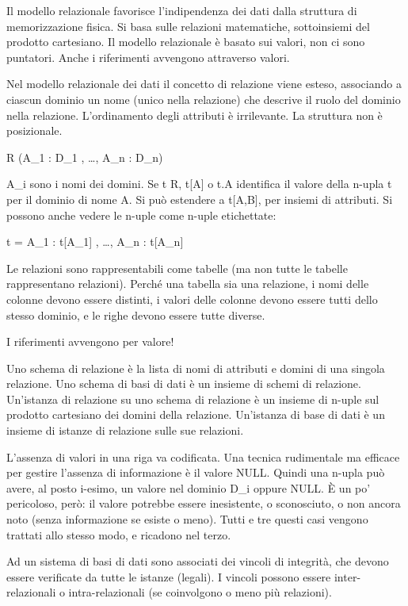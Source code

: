 Il modello relazionale favorisce l'indipendenza dei dati dalla struttura di memorizzazione fisica. Si basa sulle relazioni matematiche, sottoinsiemi del prodotto cartesiano. Il modello relazionale \`e basato sui valori, non ci sono puntatori. Anche i riferimenti avvengono attraverso valori.

Nel modello relazionale dei dati il concetto di relazione viene esteso, associando a ciascun dominio un nome (unico nella relazione) che descrive il ruolo del dominio nella relazione. L'ordinamento degli attributi \`e irrilevante. La struttura non \`e posizionale.

R (A_1 : D_1 , \ldots , A_n : D_n)

A_i sono i nomi dei domini. Se t \in R, t[A] o t.A identifica il valore della n-upla t per il dominio di nome A. Si pu\`o estendere a t[A,B], per insiemi di attributi. Si possono anche vedere le n-uple come n-uple etichettate:

t = \langle A_1 : t[A_1] , \ldots , A_n : t[A_n] \rangle

Le relazioni sono rappresentabili come tabelle (ma non tutte le tabelle rappresentano relazioni). Perch\'e una tabella sia una relazione, i nomi delle colonne devono essere distinti, i valori delle colonne devono essere tutti dello stesso dominio, e le righe devono essere tutte diverse.

I riferimenti avvengono per valore!

Uno schema di relazione \`e la lista di nomi di attributi e domini di una singola relazione. Uno schema di basi di dati \`e un insieme di schemi di relazione. Un'istanza di relazione su uno schema di relazione \`e un insieme di n-uple sul prodotto cartesiano dei domini della relazione. Un'istanza di base di dati \`e un insieme di istanze di relazione sulle sue relazioni.

L'assenza di valori in una riga va codificata. Una tecnica rudimentale ma efficace per gestire l'assenza di informazione \`e il valore NULL. Quindi una n-upla pu\`o avere, al posto i-esimo, un valore nel dominio D_i oppure NULL. \`E un po' pericoloso, per\`o: il valore potrebbe essere inesistente, o sconosciuto, o non ancora noto (senza informazione se esiste o meno). Tutti e tre questi casi vengono trattati allo stesso modo, e ricadono nel terzo.

Ad un sistema di basi di dati sono associati dei vincoli di integrit\`a, che devono essere verificate da tutte le istanze (legali). I vincoli possono essere inter-relazionali o intra-relazionali (se coinvolgono o meno pi\`u relazioni).

